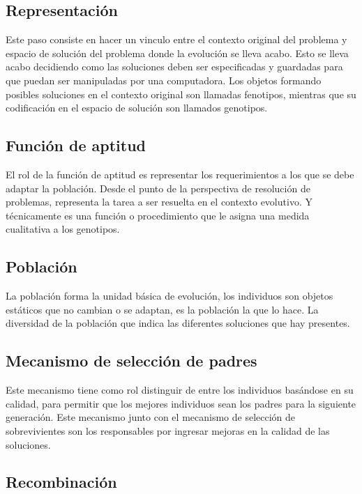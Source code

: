 \subsection{Representación}

Este paso consiste en hacer un vinculo entre el contexto original del problema y espacio de solución del problema donde la evolución se lleva acabo. Esto se lleva acabo decidiendo como las soluciones deben ser especificadas y guardadas para que puedan ser manipuladas por una computadora. Los objetos formando posibles soluciones en el contexto original son llamadas fenotipos, mientras que su codificación en el espacio de solución son llamados genotipos.

\subsection{Función de aptitud}

El rol de la función de aptitud es representar los requerimientos a los que se debe adaptar la población. Desde el punto de la perspectiva de resolución de problemas, representa la tarea a ser resuelta en el contexto evolutivo. Y técnicamente  es una función o procedimiento que le asigna una medida cualitativa a los genotipos.

\subsection{Población}

La población forma la unidad básica de evolución, los individuos son objetos estáticos que no cambian o se adaptan, es la población la que lo hace. La diversidad de la población que indica las diferentes soluciones que hay presentes.

\subsection{Mecanismo de selección de padres}

Este mecanismo tiene como rol distinguir de entre los individuos basándose en su calidad, para permitir que los mejores individuos sean los padres para la siguiente generación. Este mecanismo junto con el mecanismo de selección de sobrevivientes son los responsables por ingresar mejoras en la calidad de las soluciones.

\subsection{Recombinación}

